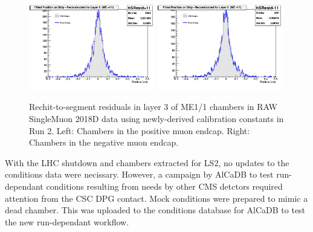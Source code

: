 \begin{figure}[H]
    \centering
    {\includegraphics[width=0.49\textwidth]{Images/DetectorPerformance/CSCCalibStudy2019/ConstValidationPlots/hSResidplus11.png}}
    {\includegraphics[width=0.49\textwidth]{Images/DetectorPerformance/CSCCalibStudy2019/ConstValidationPlots/hSResidminus11.png}}
    \caption{Rechit-to-segment residuals in layer 3 of ME1/1 chambers in RAW SingleMuon 2018D data using newly-derived calibration constants in Run 2. Left: Chambers in the positive muon endcap. Right: Chambers in the negative muon endcap.}
    \label{fig:CalibVal1}
\end{figure}

With the LHC shutdown and chambers extracted for LS2, no updates to the conditions data were necissary. However, a campaign by AlCaDB to test run-dependant conditions resulting from needs by other CMS detctors required attention from the CSC DPG contact. Mock conditions were prepared to mimic a dead chamber. This was uploaded to the conditions database for AlCaDB to test the new run-dependant workflow.

